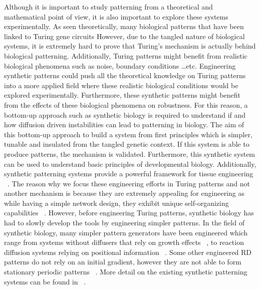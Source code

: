 Although it is important to study patterning from a theoretical and mathematical point of view, it is also important to explore these systems experimentally.
As seen theoretically, many biological patterns that have been linked to Turing gene circuits %
However, due to the tangled nature of biological systems, it is extremely hard to prove that Turing’s mechanism is actually behind biological patterning.
Additionally, Turing patterns might benefit from realistic biological phenomena such as noise, boundary conditions \ldots etc.
Engineering synthetic patterns could push all the theoretical knowledge on Turing patterns into a more applied field where these realistic biological conditions would be explored experimentally.
Furthermore, these synthetic patterns might benefit from the effects of these biological phenomena on robustness.
For this reason, a bottom-up approach such as synthetic biology is required to understand if and how diffusion driven instabilities can lead to patterning in biology.
The aim of this bottom-up approach to build a system from first principles which is simpler, tunable and insulated from the tangled genetic context.
If this system is able to produce patterns, the mechanism is validated.
Furthermore, this synthetic system can be used to understand basic principles of developmental biology.
Additionally, synthetic patterning systems provide a powerful framework for tissue engineering ~\parencite{Scholes2017}. %
The reason why we focus these engineering efforts in Turing patterns and not another mechanism is because they are extremely appealing for engineering as while having a simple network design, they exhibit unique self-organizing capabilities ~\parencite{Diambra2015a}.
However, before engineering Turing patterns, synthetic biology has had to slowly develop the tools by engineering simpler patterns.
In the field of synthetic biology, many simpler pattern generators have been engineered which range from systems without diffusers that rely on growth effects ~\parencite{Potvin-Trottier2016, Riglar2019}, to reaction diffusion systems relying on positional information ~\parencite{Barbier2020,Basu2005, Boehm2018, Grant2020, Kong2017, Schaerli2014}.
Some other engineered RD patterns do not rely on an initial gradient, however they are not able to form stationary periodic patterns ~\parencite{Cao2016, Danino2010, Payne2013}.
More detail on the existing synthetic patterning systems can be found in ~\parencite{huidobro}. %
